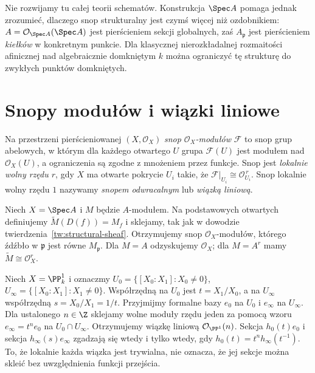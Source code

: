 \begin{uwaga}
Nie rozwijamy tu całej teorii schematów. Konstrukcja
$\Spec A$ pomaga jednak zrozumieć, dlaczego snop
strukturalny jest czymś więcej niż ozdobnikiem:
$A=\mathcal O_{\Spec A}(\Spec A)$ jest pierścieniem
sekcji globalnych, zaś $A_{\mathfrak p}$ jest
pierścieniem \emph{kiełków} w konkretnym punkcie.
Dla klasycznej nierozkładalnej rozmaitości afinicznej
nad algebraicznie domkniętym $k$ można ograniczyć
tę strukturę do zwykłych punktów domkniętych.
\end{uwaga}

\section{Snopy modułów i wiązki liniowe}
\label{sec:wiazki}

\begin{definicja}
Na przestrzeni pierścieniowanej $(X,\mathcal O_X)$
\emph{snop $\mathcal O_X$-modułów} $\mathcal F$
to snop grup abelowych, w którym dla każdego
otwartego $U$ grupa $\mathcal F(U)$ jest modułem
nad $\mathcal O_X(U)$, a ograniczenia są zgodne
z mnożeniem przez funkcje. Snop jest \emph{lokalnie
wolny rzędu $r$}, gdy $X$ ma otwarte pokrycie
$U_i$ takie, że
$\mathcal F|_{U_i}\cong\mathcal O_{U_i}^{\,r}$.
Snop lokalnie wolny rzędu $1$ nazywamy
\emph{snopem odwracalnym} lub \emph{wiązką liniową}.
\end{definicja}

\begin{przyklad}
Niech $X=\Spec A$ i $M$ będzie $A$-modułem.
Na podstawowych otwartych definiujemy
$\widetilde M(D(f))=M_f$ i sklejamy, tak jak w
dowodzie twierdzenia~\ref{tw:structural-sheaf}.
Otrzymujemy snop $\mathcal O_X$-modułów, którego
źdźbło w $\mathfrak p$ jest równe $M_{\mathfrak p}$.
Dla $M=A$ odzyskujemy $\mathcal O_X$; dla
$M=A^r$ mamy $\widetilde M\cong\mathcal O_X^r$.
\end{przyklad}

\begin{przyklad}
Niech $X=\PP^1_k$ i oznaczmy
$U_0=\{[X_0:X_1]:X_0\ne0\}$,
$U_\infty=\{[X_0:X_1]:X_1\ne0\}$.
Współrzędną na $U_0$ jest $t=X_1/X_0$,
a na $U_\infty$ współrzędną $s=X_0/X_1=1/t$.
Przyjmijmy formalne bazy $e_0$ na $U_0$
i $e_\infty$ na $U_\infty$. Dla ustalonego
$n\in\Z$ sklejamy wolne moduły rzędu jeden
za pomocą wzoru $e_\infty=t^n e_0$
na $U_0\cap U_\infty$. Otrzymujemy wiązkę
liniową $\mathcal O_{\PP^1}(n)$.
Sekcja $h_0(t)e_0$ i sekcja $h_\infty(s)e_\infty$
zgadzają się wtedy i tylko wtedy, gdy
$h_0(t)=t^n h_\infty(t^{-1})$.
To, że lokalnie każda wiązka jest trywialna,
nie oznacza, że jej sekcje można skleić bez
uwzględnienia funkcji przejścia.
\end{przyklad}

